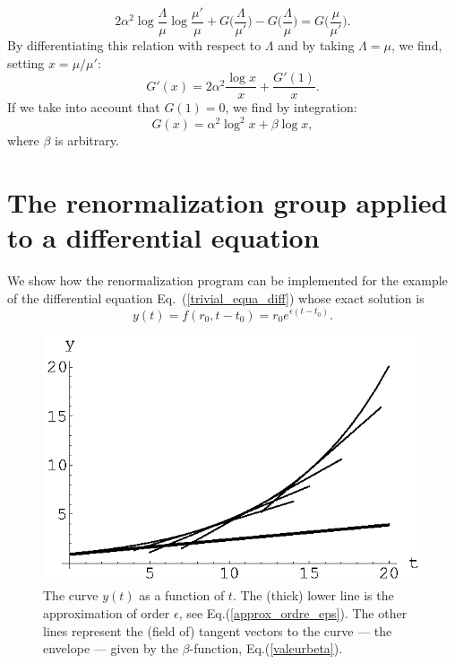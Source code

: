 \documentclass[floatfix,twocolumn,preprintnumbers,amsmath,amssymb,prb]{revtex4}
\begin{document}
{{\begin{equation}
2 \alpha^2\log\frac{\Lambda}{\mu} \log\frac{\mu'}{\mu} +
G\big(\frac{\Lambda}{\mu'}\big)-
G\big(\frac{\Lambda}{\mu}\big)= G\big(\frac{\mu}{\mu'}\big).
\label{equaG}
\end{equation}
By differentiating this relation with respect to $\Lambda$ and by taking $\Lambda=\mu$, we find, setting $x=\mu/\mu'$:
\begin{equation}
G'(x)=2 \alpha^2 \frac{\log x}{x} + \frac{G'(1)}{x}.
\end{equation}
If we take into account that $G(1)=0$, we find
by integration:
\begin{equation}
G(x)=\alpha^2 \log^2x +\beta \log x,
\end{equation}
where $\beta$ is arbitrary.

\section{The renormalization group applied to a differential equation}
\label{appendix_E}
We show how the renormalization program can be
implemented for the example of the differential equation
Eq.~(\ref{trivial_equa_diff}) whose exact solution is
\begin{equation}
y(t)=f(r_0,t-t_0)=r_0 e^{\epsilon(t-t_0)}.
\end{equation}

\begin{figure}[htbp] 
\begin{center}
\includegraphics[width=.9\linewidth,origin=tl]{enveloppe.eps}\hfill%
\end{center}
\caption{The curve $y(t)$ as a function of $t$. The (thick) lower line is the approximation of order $\epsilon$, see Eq.(\ref{approx_ordre_eps}). 
The other lines represent the (field of) tangent vectors to the curve  --- the envelope ---  given by the $\beta$-function, Eq.(\ref{valeurbeta}).}
\label{enveloppe}
\end{figure}

}}
\end{document}
